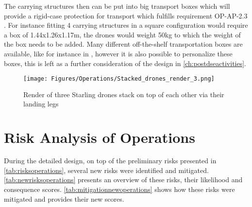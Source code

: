 
The carrying structures then can be put into big transport boxes which will provide a rigid-case protection for transport which fulfills requirement OP-AP-2.3 \label{req:OP-AP-2.3}. For instance fitting 4 carrying structures in a square configuration would require a box of 1.44x1.26x1.17m, the drones would weight 50kg to which the weight of the box needs to be added. Many different off-the-shelf transportation boxes are available, like for instance in \cite{Transportbox}, however it is also possible to personalize these boxes, this is left as a further consideration of the design in \autoref{ch:postdseactivities}.

\begin{figure} \centering
  \texttt{[image: Figures/Operations/Stacked\_drones\_render\_3.png]}
  \caption{Render of three Starling drones stack on top of each other via their landing legs}
  \label{fig:stack3}
\end{figure}


\section{Risk Analysis of Operations} \label{sec:opsriskanalysis}

During the detailed design, on top of the preliminary risks presented in \autoref{tab:risksoperations}, several new risks were identified and mitigated. \autoref{tab:newrisksoperations} presents an overview of these risks, their likelihood and consequence scores. \autoref{tab:mitigationnewoperations} shows how these risks were mitigated and provides their new scores.

